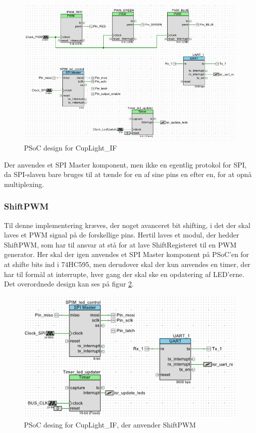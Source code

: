 \documentclass[Softwaredesign/Softwaredesign_main.tex]{subfiles}
\begin{document}
\begin{figure}[H]
    \centering
    \includegraphics[width=\textwidth]{Softwaredesign/CupLight_IF/graphics/CupLightPSoCDesign.png}
    \caption{PSoC design for CupLight\_IF}
    \label{fig:CupLight_PSoC_Design}
\end{figure}

Der anvendes et SPI Master komponent, men ikke en egentlig protokol for SPI, da SPI-slaven bare bruges til at tænde for en af sine pins en efter en, for at opnå multiplexing.

\subsubsection{ShiftPWM}
Til denne implementering kræves, der noget avanceret bit shifting, i det der skal laves et PWM signal på de forskellige pins. Hertil laves et modul, der hedder ShiftPWM, som har til ansvar at stå for at lave ShiftRegisteret til en PWM generator. Her skal der igen anvendes et SPI Master komponent på PSoC'en for at shifte bits ind i 74HC595, men derudover skal der kun anvendes en timer, der har til formål at interrupte, hver gang der skal ske en opdatering af LED'erne. Det overordnede design kan ses på figur \ref{fig:CupLight_ShiftPWM_PSoC_Design}.

\begin{figure}
    \centering
    \includegraphics{Softwaredesign/CupLight_IF/graphics/CupLightPSoCDesign_ShiftPWM.png}
    \caption{PSoC desing for CupLight\_IF, der anvender ShiftPWM}
    \label{fig:CupLight_ShiftPWM_PSoC_Design}
\end{figure}
\end{document}
